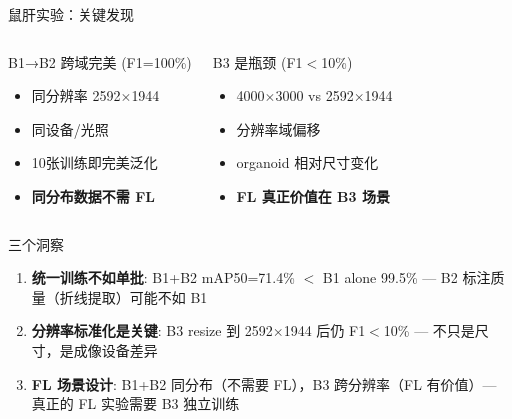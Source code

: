 \documentclass[aspectratio=169, 10pt]{beamer}
\begin{document}
\begin{frame}{鼠肝实验：关键发现}
  \begin{columns}[T]
    \begin{alertblock}{B1→B2 跨域完美 (F1=100\%)}
      \begin{itemize}
        \item 同分辨率 2592$\times$1944
        \item 同设备/光照
        \item 10张训练即完美泛化
        \item \textbf{同分布数据不需 FL}
      \end{itemize}
    \end{alertblock}
    \begin{alertblock}{B3 是瓶颈 (F1$<$10\%)}
      \begin{itemize}
        \item 4000$\times$3000 vs 2592$\times$1944
        \item 分辨率域偏移
        \item organoid 相对尺寸变化
        \item \textbf{FL 真正价值在 B3 场景}
      \end{itemize}
    \end{alertblock}
  \end{columns}
  \vspace{0em}
  \begin{block}{三个洞察}
    \begin{enumerate}
      \item \textbf{统一训练不如单批}: B1+B2 mAP50=71.4\% $<$ B1 alone 99.5\% — B2 标注质量（折线提取）可能不如 B1
      \item \textbf{分辨率标准化是关键}: B3 resize 到 2592$\times$1944 后仍 F1$<$10\% — 不只是尺寸，是成像设备差异
      \item \textbf{FL 场景设计}: B1+B2 同分布（不需要 FL），B3 跨分辨率（FL 有价值）— 真正的 FL 实验需要 B3 独立训练
    \end{enumerate}
  \end{block}
\end{frame}
\end{document}

